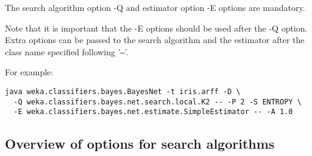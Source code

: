 The search algorithm option -Q and estimator option -E options are mandatory.

Note that it is important that the -E options should be used after the
-Q option. Extra options can be passed to the search algorithm and
the estimator after the class name specified following '\texttt{--}'.

\noindent For example:
{\small
\begin{verbatim}
java weka.classifiers.bayes.BayesNet -t iris.arff -D \
  -Q weka.classifiers.bayes.net.search.local.K2 -- -P 2 -S ENTROPY \
  -E weka.classifiers.bayes.net.estimate.SimpleEstimator -- -A 1.0
\end{verbatim}
}

\subsection*{Overview of options for search algorithms}

